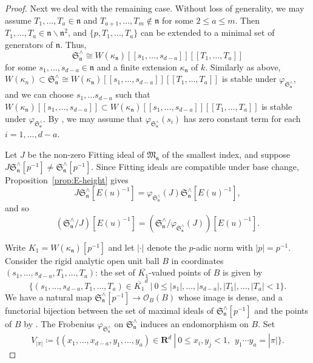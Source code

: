 \begin{proof}
Next we deal with the remaining case. Without loss of generality, we may assume $T_1, \ldots, T_a \in \mathfrak{n}$ and $T_{a+1}, \ldots, T_m \notin \mathfrak{n}$ for some $2 \leq a \leq m$. Then $T_1, \ldots, T_a \in \mathfrak{n} \smallsetminus \mathfrak{n}^2$, and $\{p, T_1, \ldots, T_a\}$ can be extended to a minimal set of generators of $\mathfrak{n}$. Thus,
\[
\mathfrak{S}_{\mathfrak{n}}^{\wedge} \cong W(\kappa_{\mathfrak{n}})[\![s_1, \ldots, s_{d-a}]\!][\![T_1, \ldots, T_a]\!]
\]
for some $s_1, \ldots, s_{d-a} \in \mathfrak{n}$ and a finite extension $\kappa_{\mathfrak{n}}$ of $k$. Similarly as above, $W(\kappa_n) \subset \mathfrak{S}_{\mathfrak{n}}^{\wedge} \cong W(\kappa_{\mathfrak{n}})[\![s_1, \ldots, s_{d-a}]\!][\![T_1, \ldots, T_a]\!]$ is stable under $\varphi_{\mathfrak{S}_{\mathfrak{n}}^{\wedge}}$, and we can choose $s_1, \ldots s_{d-a}$ such that $W(\kappa_{\mathfrak{n}})[\![s_1, \ldots, s_{d-a}]\!] \subset W(\kappa_{\mathfrak{n}})[\![s_1, \ldots, s_{d-a}]\!][\![T_1, \ldots, T_a]\!]$ is stable under $\varphi_{\mathfrak{S}_{\mathfrak{n}}^{\wedge}}$. By \cite[Lem.~4.11]{du-liu-moon-shimizu-completed-prismatic-F-crystal-loc-system}, we may assume that $\varphi_{\mathfrak{S}_{\mathfrak{n}}^{\wedge}}(s_i)$ has zero constant term for each $i = 1, \ldots, d-a$.

Let $J$ be the non-zero Fitting ideal of $\mathfrak{M}_{\mathfrak{n}}$ of the smallest index, and suppose $J\mathfrak{S}_{\mathfrak{n}}^{\wedge}[p^{-1}] \neq \mathfrak{S}_{\mathfrak{n}}^{\wedge}[p^{-1}]$. Since Fitting ideals are compatible under base change, Proposition~\ref{prop:E-height} gives
\begin{equation} \label{eq:Fitting-ideal}
J\mathfrak{S}_{\mathfrak{n}}^{\wedge}[E(u)^{-1}] = \varphi_{\mathfrak{S}_{\mathfrak{n}}^{\wedge}}(J)\mathfrak{S}_{\mathfrak{n}}^{\wedge}[E(u)^{-1}],
\end{equation}
and so
\begin{equation} \label{eq:Fitting-ideal-2}
(\mathfrak{S}_{\mathfrak{n}}^{\wedge}/J)[E(u)^{-1}] = (\mathfrak{S}_{\mathfrak{n}}^{\wedge}/\varphi_{\mathfrak{S}_{\mathfrak{n}}^{\wedge}}(J))[E(u)^{-1}].    
\end{equation}

Write $K_1 = W(\kappa_{\mathfrak{n}})[p^{-1}]$ and let $\lvert \cdot\rvert$ denote the $p$-adic norm with $|p| = p^{-1}$. Consider the rigid analytic open unit ball $B$ in coordinates $(s_1, \ldots, s_{d-a}, T_1, \ldots, T_a)$: the set of $\overline{K_1}$-valued points of $B$ is given by
\[
\{(s_1, \ldots, s_{d-a}, T_1, \ldots, T_a) \in \overline{K_1}^d ~|~ 0 \leq |s_1|, \ldots, |s_{d-a}|, |T_1|, \ldots, |T_a| < 1 \}.
\]
We have a natural map $\mathfrak{S}_{\mathfrak{n}}^{\wedge}[p^{-1}] \rightarrow \mathcal{O}_B(B)$ whose image is dense, and a functorial bijection between the set of maximal ideals of $\mathfrak{S}_{\mathfrak{n}}^{\wedge}[p^{-1}]$ and the points of $B$ by \cite[Lem.~7.1.9]{deJong-dieudonnemodule}. The Frobenius $\varphi_{\mathfrak{S}_{\mathfrak{n}}^{\wedge}}$ on $\mathfrak{S}_{\mathfrak{n}}^{\wedge}$ induces an endomorphism on $B$. Set
\[
V_{|\pi|} \coloneqq \{(x_1, \ldots, x_{d-a}, y_1, \ldots, y_a) \in \mathbf{R}^d ~|~ 0 \leq x_i, y_j < 1, ~~y_1\cdots y_a = |\pi| \}.
\]


\end{proof}
